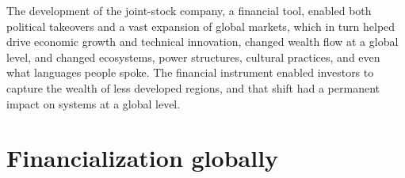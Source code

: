 The development of the joint-stock company, a financial tool, enabled both political takeovers and a vast expansion of global markets, which in turn helped drive economic growth and technical innovation, changed wealth flow at a global level, and changed ecosystems, power structures, cultural practices, and even what languages people spoke. The financial instrument enabled investors to capture the wealth of less developed regions, and that shift had a permanent impact on systems at a global level. %








\section{Financialization globally}

